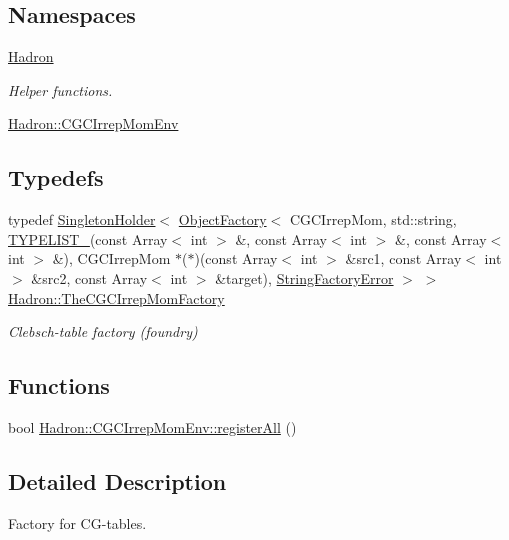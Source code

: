 \subsection*{Namespaces}
\begin{DoxyCompactItemize}
\item 
 \mbox{\hyperlink{namespaceHadron}{Hadron}}
\begin{DoxyCompactList}\small\item\em Helper functions. \end{DoxyCompactList}\item 
 \mbox{\hyperlink{namespaceHadron_1_1CGCIrrepMomEnv}{Hadron\+::\+C\+G\+C\+Irrep\+Mom\+Env}}
\end{DoxyCompactItemize}
\subsection*{Typedefs}
\begin{DoxyCompactItemize}
\item 
typedef \mbox{\hyperlink{classUtil_1_1SingletonHolder}{Singleton\+Holder}}$<$ \mbox{\hyperlink{classUtil_1_1ObjectFactory}{Object\+Factory}}$<$ C\+G\+C\+Irrep\+Mom, std\+::string, \mbox{\hyperlink{adat__devel__install_2include_2adat_2typelist_8h_a0309f68a543c5c0994f9edc0e56dc59f}{T\+Y\+P\+E\+L\+I\+S\+T\+\_}}(const Array$<$ int $>$ \&, const Array$<$ int $>$ \&, const Array$<$ int $>$ \&), C\+G\+C\+Irrep\+Mom $\ast$($\ast$)(const Array$<$ int $>$ \&src1, const Array$<$ int $>$ \&src2, const Array$<$ int $>$ \&target), \mbox{\hyperlink{structUtil_1_1StringFactoryError}{String\+Factory\+Error}} $>$ $>$ \mbox{\hyperlink{namespaceHadron_a4657a351a06d86fb997a0765f97e3f13}{Hadron\+::\+The\+C\+G\+C\+Irrep\+Mom\+Factory}}
\begin{DoxyCompactList}\small\item\em Clebsch-\/table factory (foundry) \end{DoxyCompactList}\end{DoxyCompactItemize}
\subsection*{Functions}
\begin{DoxyCompactItemize}
\item 
bool \mbox{\hyperlink{namespaceHadron_1_1CGCIrrepMomEnv_af8421782c41f7dee9d5b4a17fc748862}{Hadron\+::\+C\+G\+C\+Irrep\+Mom\+Env\+::register\+All}} ()
\end{DoxyCompactItemize}


\subsection{Detailed Description}
Factory for C\+G-\/tables. 

